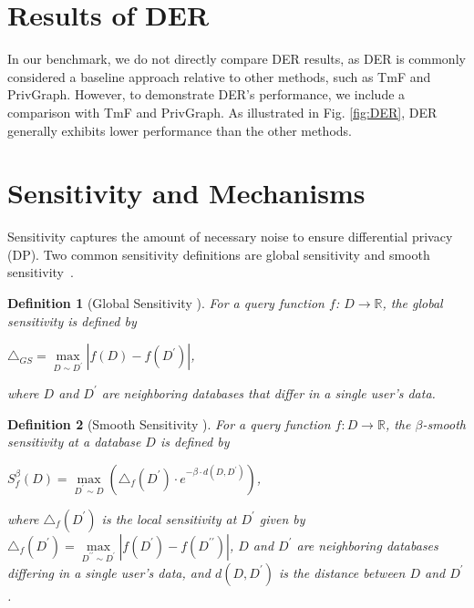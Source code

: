 \documentclass[conference]{IEEEtran}
\theoremstyle{plain}
\newtheorem{definition}{Definition}
\begin{document}
\section{Results of DER}
In our benchmark, we do not directly compare DER results, as DER is commonly considered a baseline approach relative to other methods, such as TmF and PrivGraph. 
However, to demonstrate DER's performance, we include a comparison with TmF and PrivGraph. 
As illustrated in Fig. \ref{fig:DER}, DER generally exhibits lower performance than the other methods.

\section{Sensitivity and Mechanisms}
Sensitivity \cite{dwork2014algorithmic} captures the amount of necessary noise to ensure differential privacy (DP). 
Two common sensitivity definitions are global sensitivity \cite{dwork2014algorithmic} and smooth sensitivity~\cite{nissim2007smooth}.

\begin{definition}[Global Sensitivity \cite{dwork2014algorithmic}]
	\label{def:global sensitivity}
    For a query function $f$: $D \rightarrow \mathbb{R}$, the global sensitivity is defined by 
       \begin{center}
           $\triangle_{GS}=\mathop{max}\limits_{D\sim D^\prime}|f(D)-f(D^\prime)|$,
       \end{center}
       where $D$ and $D^\prime$ are neighboring databases that differ in a single user's data.
\end{definition}

\begin{definition}[Smooth Sensitivity \cite{nissim2007smooth}]
	\label{def:smooth_sensitivity}
    For a query function $f: D \rightarrow \mathbb{R}$, the $\beta$-smooth sensitivity at a database $D$ is defined by 
       \begin{center}
           $S^\beta_f(D) = \mathop{max}\limits_{D^\prime \sim D} \left( \triangle_f(D^\prime) \cdot e^{-\beta \cdot d(D,D^\prime)} \right)$,
       \end{center}
       where $\triangle_f(D^\prime)$ is the local sensitivity at $D^\prime$ given by $\triangle_f(D^\prime) = \mathop{max}\limits_{D^{\prime\prime} \sim D^\prime} |f(D^\prime) - f(D^{\prime\prime})|$, $D$ and $D^\prime$ are neighboring databases differing in a single user's data, and $d(D, D^\prime)$ is the distance between $D$ and $D^\prime$.
\end{definition}
\end{document}
